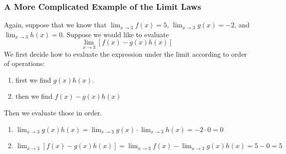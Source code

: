 \documentclass[serif,ignorenonframetext]{beamer}
\newcommand{\ds}{\displaystyle}
\begin{document}
\begin{frame}
  \frametitle{A More Complicated Example of the Limit Laws}
  Again, suppose that we know that $\ds\lim_{x\to 3} f(x) = 5$,
  $\ds\lim_{x\to 3} g(x) = -2$, and $\ds\lim_{x\to 3} h(x) = 0$.  
  Suppose we would like to evaluate
  \begin{displaymath}
    \lim_{x\to 3} [f(x) - g(x)h(x)]
  \end{displaymath}
  \pause
  We first decide how to evaluate
  the expression under the limit according to order of operations:
  \begin{enumerate}
  \item first we find $g(x)h(x)$.  
  \item then we find $f(x)-g(x)h(x)$
  \end{enumerate}
  \pause
  Then we evaluate those in order.
  \begin{enumerate}
  \item $\ds\lim_{x\to 3} g(x)h(x) 
    = \lim_{x\to 3} g(x) \cdot \lim_{x\to 3} h(x) = -2\cdot 0 = 0$
  \item $\ds\lim_{x\to 3} [f(x)-g(x)h(x)]
    = \lim_{x\to 3} f(x) - \lim_{x\to 3} g(x)h(x)
    = 5 - 0 = 5$
  \end{enumerate}
\end{frame}
\end{document}
